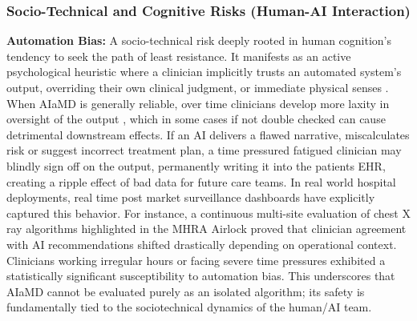 \documentclass[11pt,a4paper]{article}
\begin{document}
\subsubsection{Socio-Technical and Cognitive Risks (Human-AI Interaction)}
\label{sec:Socio-Technical and Cognitive Risks (Human-AI Interaction)}

\textbf{Automation Bias:}
A socio-technical risk deeply rooted in human cognition's tendency to seek the path of least resistance. It manifests as an active psychological heuristic where a clinician implicitly trusts an automated system's output, overriding their own clinical judgment, or immediate physical senses \cite{Goddard2012} . When AIaMD is generally reliable, over time clinicians develop more laxity in oversight of the output \cite{parasuraman2010complacency} , which in some cases if not double checked can cause detrimental downstream effects. If an AI delivers a flawed narrative, miscalculates risk or suggest incorrect treatment plan, a time pressured fatigued clinician may blindly sign off on the output, permanently writing it into the patients EHR, creating a ripple effect of bad data for future care teams.
In real world hospital deployments, real time post market surveillance dashboards have explicitly captured this behavior. For instance, a continuous multi-site evaluation of chest X ray algorithms highlighted in the MHRA Airlock \cite{mhra2025} proved that clinician agreement with AI recommendations shifted drastically depending on operational context. Clinicians working irregular hours or facing severe time pressures exhibited a statistically significant susceptibility to automation bias. This underscores that AIaMD cannot be evaluated purely as an isolated algorithm; its safety is fundamentally tied to the sociotechnical dynamics of the human/AI team.
\end{document}
